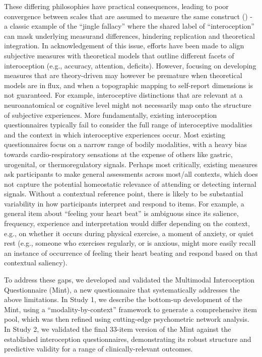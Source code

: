 \documentclass[
  jou,
  floatsintext,
  longtable,
  nolmodern,
  notxfonts,
  notimes,
  colorlinks=true,linkcolor=blue,citecolor=blue,urlcolor=blue]{apa7}
\begin{document}
These differing philosophies have practical consequences, leading to
poor convergence between scales that are assumed to measure the same
construct () - a
classic example of the ``jingle fallacy'' where the shared label of
``interoception'' can mask underlying measurand differences, hindering
replication and theoretical integration. In acknowledgement of this
issue, efforts have been made to align subjective measures with
theoretical models that outline different facets of interoception (e.g.,
accuracy, attention, deficits). However, focusing on developing measures
that are theory-driven may however be premature when theoretical models
are in flux, and when a topographic mapping to self-report dimensions is
not guaranteed. For example, interoceptive distinctions that are
relevant at a neuroanatomical or cognitive level might not necessarily
map onto the structure of subjective experiences. More fundamentally,
existing interoception questionnaires typically fail to consider the
full range of interoceptive modalities and the context in which
interoceptive experiences occur. Most existing questionnaires focus on a
narrow range of bodily modalities, with a heavy bias towards
cardio-respiratory sensations at the expense of others like gastric,
urogenital, or thermoregulatory signals. Perhaps most critically,
existing measures ask participants to make general assessments across
most/all contexts, which does not capture the potential homeostatic
relevance of attending or detecting internal signals. Without a
contextual reference point, there is likely to be substantial
variability in how participants interpret and respond to items. For
example, a general item about ``feeling your heart beat'' is ambiguous
since its salience, frequency, experience and interpretation would
differ depending on the context, e.g., on whether it occurs during
physical exercise, a moment of anxiety, or quiet rest (e.g., someone who
exercises regularly, or is anxious, might more easily recall an instance
of occurrence of feeling their heart beating and respond based on that
contextual saliency).

To address these gaps, we developed and validated the Multimodal
Interoception Questionnaire (Mint), a new questionnaire that
systematically addresses the above limitations. In Study 1, we describe
the bottom-up development of the Mint, using a ``modality-by-context''
framework to generate a comprehensive item pool, which was then refined
using cutting-edge psychometric network analysis. In Study 2, we
validated the final 33-item version of the Mint against the established
interoception questionnaires, demonstrating its robust structure and
predictive validity for a range of clinically-relevant outcomes.
\end{document}
